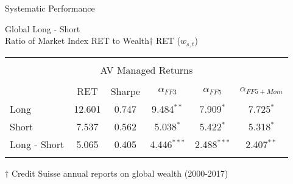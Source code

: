 \documentclass{beamer}
\begin{document}
\begin{frame}{Systematic Performance}
	\begin{center}
	Global Long - Short\\
	Ratio of Market Index RET to Wealth$\dagger$ RET ($w_{s,t}$)
	\end{center}
	\vspace{-6pt}
	\begin{adjustbox}{width=\textwidth}
		\begin{tabular}{lccccc}
			\hline\\[-1.8ex]
			\multicolumn{6}{c}{AV Managed Returns}\\
			\hline\\[-1.8ex]
			& RET & Sharpe & $\alpha_{FF3}$ & $\alpha_{FF5}$ & $\alpha_{FF5+Mom}$ \\
			\cline{2-6}
			Long & 12.601 & 0.747 & 9.484$^{**}$ & 7.909$^{*}$ & 7.725$^{*}$ \\
			Short & 7.537 & 0.562 & 5.038$^{*}$ & 5.422$^{*}$ & 5.318$^{*}$ \\
			Long - Short & 5.065 & 0.405 & 4.446$^{***}$ & 2.488$^{***}$ & 2.407$^{**}$ \\
			\hline\\[-1.8ex]
		\end{tabular}
	\end{adjustbox}
	$\dagger$ Credit Suisse annual reports on global wealth (2000-2017)
\end{frame}
\end{document}

